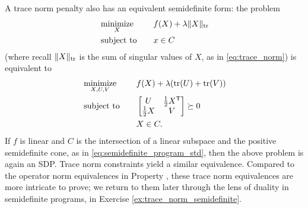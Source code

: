 A trace norm penalty also has an equivalent semidefinite form: the problem    
\begin{alignat*}{2}
&\operatorname*{minimize}_X \quad && f(X) + \lambda \|X\|_{\operatorname{tr}} \\
&\operatorname{subject\,\,to} \quad && x \in C
\end{alignat*}
(where recall $\|X\|_{\operatorname{tr}}$ is the sum of singular values of $X$, as in  
\eqref{eq:trace_norm}) is equivalent to 
\begin{alignat*}{2}
&\operatorname*{minimize}_{X,U,V} \quad && f(X) + \lambda(\operatorname{tr}(U) + \operatorname{tr}(V)) \\ 
&\operatorname{subject\,\,to} \quad && \begin{bmatrix} U & \frac{1}{2} X^{\mathsf{T}} \\ 
\frac{1}{2} X & V \end{bmatrix} \succeq 0 \\
& && X \in C.
\end{alignat*}  
If $f$ is linear and $C$ is the intersection of a linear subspace and the
positive semidefinite cone, as in \eqref{eq:semidefinite_program_std}, then the
above problem is again an SDP. Trace norm constraints yield a similar
equivalence. Compared to the operator norm equivalences in Property
, these trace norm equivalences are more
intricate to prove; we return to them later through the lens of duality in
semidefinite programs, in Exercise \ref{ex:trace_norm_semidefinite}.

\medskip


